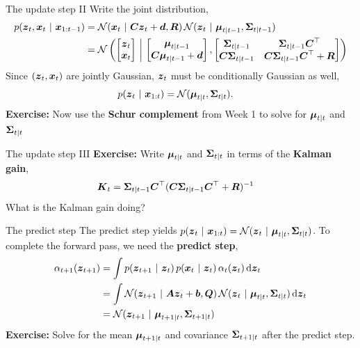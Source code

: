 \documentclass[aspectratio=169]{beamer}
\begin{document}
    
\begin{frame}[t]{The update step II}
    Write the joint distribution,
    \begin{align}
        p(\boldsymbol{z}_t, \boldsymbol{x}_t ~\vert~ \boldsymbol{x}_{1:t-1}) 
        &= 
        \mathcal{N}(\boldsymbol{x}_{t} ~\vert~ \boldsymbol{C} \boldsymbol{z}_{t} + \boldsymbol{d}, \boldsymbol{R}) \, \mathcal{N}(\boldsymbol{z}_{t} ~\vert~ \boldsymbol{\mu}_{t|t-1}, \boldsymbol{\Sigma}_{t|t-1}) \\
        &= 
        \mathcal{N} \left(
        \begin{bmatrix}
        \boldsymbol{z}_t \\
        \boldsymbol{x}_t 
        \end{bmatrix}
        \, \bigg| \, 
        \begin{bmatrix}
        \boldsymbol{\mu}_{t|t-1} \\
        \boldsymbol{C} \boldsymbol{\mu}_{t|t-1} + \boldsymbol{d}
        \end{bmatrix},
        \begin{bmatrix}
        \boldsymbol{\Sigma}_{t|t-1} & \boldsymbol{\Sigma}_{t|t-1} \boldsymbol{C}^\top \\
        \boldsymbol{C} \boldsymbol{\Sigma}_{t|t-1} & \boldsymbol{C} \boldsymbol{\Sigma}_{t|t-1} \boldsymbol{C}^\top + \boldsymbol{R}
        \end{bmatrix}
        \right)
    \end{align}
    Since $(\boldsymbol{z}_t, \boldsymbol{x}_t)$ are jointly Gaussian, $\boldsymbol{z}_t$ must be conditionally Gaussian as well,
    \begin{align}
        p(\boldsymbol{z}_t ~\vert~ \boldsymbol{x}_{1:t}) &= \mathcal{N}(\boldsymbol{\mu}_{t|t}, \boldsymbol{\Sigma}_{t|t}).
    \end{align}
    \textbf{Exercise: } Now use the \textbf{Schur complement} from Week 1 to solve for $\boldsymbol{\mu}_{t|t}$ and $\boldsymbol{\Sigma}_{t|t}$
    \end{frame}
    
    \begin{frame}[t]{The update step III}
    \textbf{Exercise: } Write $\boldsymbol{\mu}_{t|t}$ and $\boldsymbol{\Sigma}_{t|t}$ in terms of the \textbf{Kalman gain},
    \begin{align}
        \boldsymbol{K}_t &= \boldsymbol{\Sigma}_{t|t-1} \boldsymbol{C}^\top (\boldsymbol{C} \boldsymbol{\Sigma}_{t|t-1} \boldsymbol{C}^\top + \boldsymbol{R})^{-1}           
    \end{align}
    What is the Kalman gain doing?
    \end{frame}
    
    \begin{frame}[t]{The predict step}
    The predict step yields $p(\boldsymbol{z}_t ~\vert~ \boldsymbol{x}_{1:t}) = \mathcal{N}(\boldsymbol{z}_t ~\vert~ \boldsymbol{\mu}_{t|t}, \boldsymbol{\Sigma}_{t|t})$. To complete the forward pass, we need the \textbf{predict step},
    \begin{align}
        \alpha_{t+1}(\boldsymbol{z}_{t+1}) 
        &= \int p(\boldsymbol{z}_{t+1} ~\vert~ \boldsymbol{z}_{t}) \, p(\boldsymbol{x}_{t} ~\vert~ \boldsymbol{z}_{t}) \, \alpha_{t}(\boldsymbol{z}_{t}) \mathop{}\!\mathrm{d} {\boldsymbol{z}_{t}} \\
        &= \int \mathcal{N}(\boldsymbol{z}_{t+1} ~\vert~ \boldsymbol{A} \boldsymbol{z}_{t} + \boldsymbol{b}, \boldsymbol{Q}) \, \mathcal{N}(\boldsymbol{z}_{t} ~\vert~ \boldsymbol{\mu}_{t|t}, \boldsymbol{\Sigma}_{t|t}) \mathop{}\!\mathrm{d} \boldsymbol{z}_{t} \\
        &= \mathcal{N}(\boldsymbol{z}_{t+1} ~\vert~ \boldsymbol{\mu}_{t+1|t}, \boldsymbol{\Sigma}_{t+1|t})
    \end{align}
    \textbf{Exercise: } Solve for the mean $\boldsymbol{\mu}_{t+1|t}$ and covariance $\boldsymbol{\Sigma}_{t+1|t}$ after the predict step.
\end{frame}
    
\end{document}
